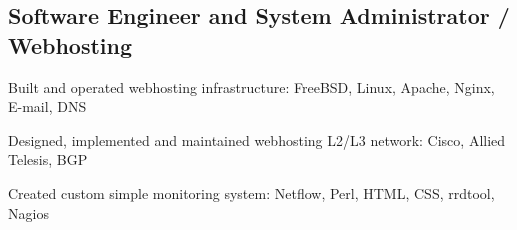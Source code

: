 \documentclass[letter,10pt]{article}
\begin{document}
\subsection{{Software Engineer and System Administrator / Webhosting}}
\begin{zitemize}
\item Built and operated webhosting infrastructure: FreeBSD, Linux, Apache, Nginx, E-mail, DNS
\item Designed, implemented and maintained webhosting L2/L3 network: Cisco, Allied Telesis, BGP
\item Created custom simple monitoring system: Netflow, Perl, HTML, CSS, rrdtool, Nagios
\end{zitemize}

%
%
\end{document}
